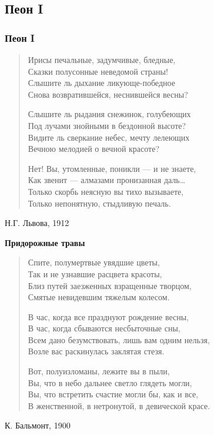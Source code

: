 \documentclass{beamer}
\begin{document}
%
\subsection{Пеон I}

\begin{frame}
\frametitle{Пеон I}
\begin{verse}
Ирисы печальные, задумчивые, бледные,\\
Сказки полусонные неведомой страны!\\
Слышите ль дыхание ликующе-победное\\
Снова возвратившейся, неснившейся весны?

Слышите ль рыдания снежинок, голубеющих\\
Под лучами знойными в бездонной высоте?\\
Видите ль сверкание небес, мечту лелеющих\\
Вечною мелодией о вечной красоте?

Нет! Вы, утомленные, поникли — и не знаете,\\
Как звенит — алмазами пронизанная даль…\\
Только скорбь неясную вы тихо вызываете,\\
Только непонятную, стыдливую печаль.
\end{verse}
Н.Г. Львова, 1912
\end{frame}

\begin{frame}

\begin{center}
\textbf{Придорожные травы }
\end{center}

\begin{verse}
Спите, полумертвые увядшие цветы, \\
Так и не узнавшие расцвета красоты, \\
Близ путей заезженных взращенные творцом, \\
Смятые невидевшим тяжелым колесом. 

В час, когда все празднуют рождение весны, \\
В час, когда сбываются несбыточные сны, \\
Всем дано безумствовать, лишь вам одним нельзя, \\
Возле вас раскинулась заклятая стезя. 

Вот, полуизломаны, лежите вы в пыли, \\
Вы, что в небо дальнее светло глядеть могли, \\
Вы, что встретить счастие могли бы, как и все, \\
В женственной, в нетронутой, в девической красе. 

\end{verse}
К. Бальмонт, 1900

\end{frame}
\end{document}
